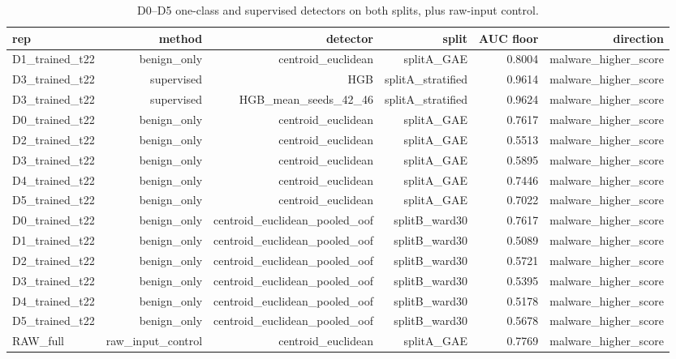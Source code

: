\begin{table}[ht]
\centering
\caption{D0--D5 one-class and supervised detectors on both splits, plus raw-input control.}
\label{tab:t6-dev}
\begin{tabular}{lrrrrr}
\toprule
rep & method & detector & split & AUC floor & direction \\
\midrule
D1\_trained\_t22 & benign\_only & centroid\_euclidean & splitA\_GAE & 0.8004 & malware\_higher\_score \\
D3\_trained\_t22 & supervised & HGB & splitA\_stratified & 0.9614 & malware\_higher\_score \\
D3\_trained\_t22 & supervised & HGB\_mean\_seeds\_42\_46 & splitA\_stratified & 0.9624 & malware\_higher\_score \\
D0\_trained\_t22 & benign\_only & centroid\_euclidean & splitA\_GAE & 0.7617 & malware\_higher\_score \\
D2\_trained\_t22 & benign\_only & centroid\_euclidean & splitA\_GAE & 0.5513 & malware\_higher\_score \\
D3\_trained\_t22 & benign\_only & centroid\_euclidean & splitA\_GAE & 0.5895 & malware\_higher\_score \\
D4\_trained\_t22 & benign\_only & centroid\_euclidean & splitA\_GAE & 0.7446 & malware\_higher\_score \\
D5\_trained\_t22 & benign\_only & centroid\_euclidean & splitA\_GAE & 0.7022 & malware\_higher\_score \\
D0\_trained\_t22 & benign\_only & centroid\_euclidean\_pooled\_oof & splitB\_ward30 & 0.7617 & malware\_higher\_score \\
D1\_trained\_t22 & benign\_only & centroid\_euclidean\_pooled\_oof & splitB\_ward30 & 0.5089 & malware\_higher\_score \\
D2\_trained\_t22 & benign\_only & centroid\_euclidean\_pooled\_oof & splitB\_ward30 & 0.5721 & malware\_higher\_score \\
D3\_trained\_t22 & benign\_only & centroid\_euclidean\_pooled\_oof & splitB\_ward30 & 0.5395 & malware\_higher\_score \\
D4\_trained\_t22 & benign\_only & centroid\_euclidean\_pooled\_oof & splitB\_ward30 & 0.5178 & malware\_higher\_score \\
D5\_trained\_t22 & benign\_only & centroid\_euclidean\_pooled\_oof & splitB\_ward30 & 0.5678 & malware\_higher\_score \\
RAW\_full & raw\_input\_control & centroid\_euclidean & splitA\_GAE & 0.7769 & malware\_higher\_score \\

\end{tabular}
\end{table}
